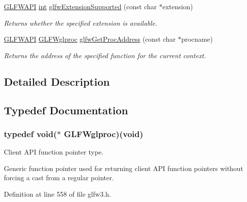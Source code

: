 \begin{DoxyCompactItemize}
\hyperlink{glfw3_8h_a56da5036b2cc259351ae22fd6439bb47}{G\-L\-F\-W\-A\-P\-I} \hyperlink{wglew_8h_a500a82aecba06f4550f6849b8099ca21}{int} \hyperlink{group__context_ga9a28c712d35f9e43534e1d03b051c04c}{glfw\-Extension\-Supported} (const char $\ast$extension)
\begin{DoxyCompactList}\small\item\em Returns whether the specified extension is available. \end{DoxyCompactList}\item 
\hyperlink{glfw3_8h_a56da5036b2cc259351ae22fd6439bb47}{G\-L\-F\-W\-A\-P\-I} \hyperlink{group__context_gabf42b10edde1c4fc71e212e576b9f811}{G\-L\-F\-Wglproc} \hyperlink{group__context_ga0e8af175218929615c16e74938c10f2a}{glfw\-Get\-Proc\-Address} (const char $\ast$procname)
\begin{DoxyCompactList}\small\item\em Returns the address of the specified function for the current context. \end{DoxyCompactList}\end{DoxyCompactItemize}


\subsection{Detailed Description}


\subsection{Typedef Documentation}
\hypertarget{group__context_gabf42b10edde1c4fc71e212e576b9f811}{
\subsubsection[{G\-L\-F\-Wglproc}]{\setlength{\rightskip}{0pt plus 5cm}typedef {\bf void}($\ast$ G\-L\-F\-Wglproc)({\bf void})}}\label{group__context_gabf42b10edde1c4fc71e212e576b9f811}


Client A\-P\-I function pointer type. 

Generic function pointer used for returning client A\-P\-I function pointers without forcing a cast from a regular pointer. 

Definition at line 558 of file glfw3.\-h.



